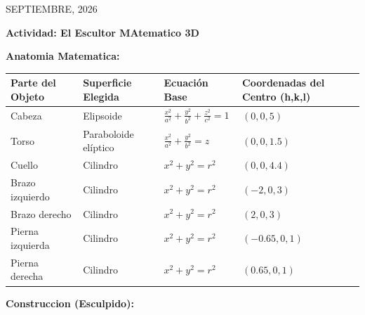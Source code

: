 \documentclass[12pt]{article}
\begin{document}
\vfill
\begin{flushright}
{\small SEPTIEMBRE, 2026}
\end{flushright}

\newpage

\begin{justfy}
{\Large \textbf{Actividad: El Escultor MAtematico 3D}}
\end{justfy}

\vspace{0.3cm}
\begin{justfy}
    \small \textbf{Anatomia Matematica:}
\end{justfy}

\begin{center}

\renewcommand{\arraystretch}{2}

\begin{tabular}{|p{3.2cm}|p{4.0cm}|p{4.0cm}|p{4.0cm}|}
\hline

\textbf{Parte del Objeto} &
\textbf{Superficie Elegida} &
\textbf{Ecuación Base} &
\textbf{Coordenadas del Centro (h,k,l)} \\

\hline
Cabeza &
Elipsoide &
$\displaystyle \frac{x^2}{a^2}+
\frac{y^2}{b^2}+
\frac{z^2}{c^2}=1$ &
$(0,0,5)$ \\

\hline
Torso &
Paraboloide elíptico &
$\displaystyle \frac{x^2}{a^2}+
\frac{y^2}{b^2}= z$ &
$(0,0,1.5)$ \\

\hline
Cuello &
Cilindro &
$\displaystyle x^2 + y^2 = r^2$ &
$(0,0,4.4)$ \\

\hline
Brazo izquierdo &
Cilindro &
$\displaystyle x^2 + y^2 = r^2$ &
$(-2,0,3)$ \\

\hline
Brazo derecho &
Cilindro &
$\displaystyle x^2 + y^2 = r^2$ &
$(2,0,3)$ \\

\hline
Pierna izquierda &
Cilindro &
$\displaystyle x^2 + y^2 = r^2$ &
$(-0.65,0,1)$ \\

\hline
Pierna derecha &
Cilindro &
$\displaystyle x^2 + y^2 = r^2$ &
$(0.65,0,1)$ \\
\hline
\end{tabular}
\end{center}

\vspace{0.5cm}
\begin{justfy}
    \small \textbf{Construccion (Esculpido):}
\end{justfy}
\end{document}
